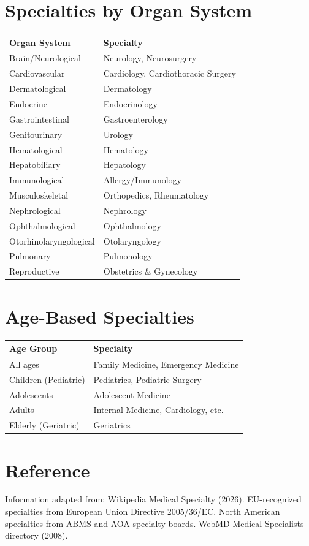 \section*{Specialties by Organ System}

\begin{tabularx}{\textwidth}{@{}lX@{}}
\toprule
\textbf{Organ System} & \textbf{Specialty} \\
\midrule
Brain/Neurological & Neurology, Neurosurgery \\
Cardiovascular & Cardiology, Cardiothoracic Surgery \\
Dermatological & Dermatology \\
Endocrine & Endocrinology \\
Gastrointestinal & Gastroenterology \\
Genitourinary & Urology \\
Hematological & Hematology \\
Hepatobiliary & Hepatology \\
Immunological & Allergy/Immunology \\
Musculoskeletal & Orthopedics, Rheumatology \\
Nephrological & Nephrology \\
Ophthalmological & Ophthalmology \\
Otorhinolaryngological & Otolaryngology \\
Pulmonary & Pulmonology \\
Reproductive & Obstetrics \& Gynecology \\
\bottomrule
\end{tabularx}

\section*{Age-Based Specialties}

\begin{tabularx}{\textwidth}{@{}lX@{}}
\toprule
\textbf{Age Group} & \textbf{Specialty} \\
\midrule
All ages & Family Medicine, Emergency Medicine \\
Children (Pediatric) & Pediatrics, Pediatric Surgery \\
Adolescents & Adolescent Medicine \\
Adults & Internal Medicine, Cardiology, etc. \\
Elderly (Geriatric) & Geriatrics \\
\bottomrule
\end{tabularx}

\section*{Reference}

\noindent Information adapted from: Wikipedia Medical Specialty (2026). EU-recognized specialties from European Union Directive 2005/36/EC. North American specialties from ABMS and AOA specialty boards. WebMD Medical Specialists directory (2008).

